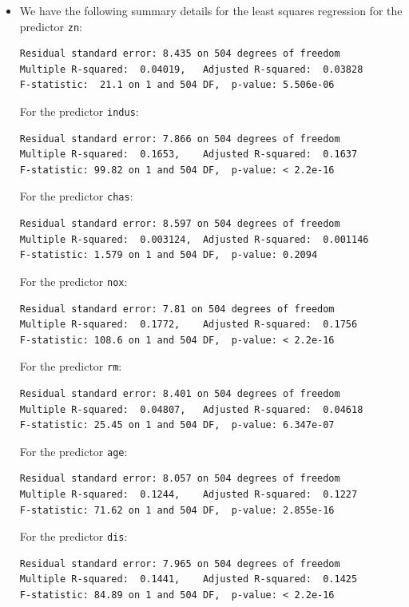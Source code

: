 \begin{itemize}
    \item[(a)] We have the following summary details for the least squares regression
        for the predictor \verb|zn|:
        \begin{lstlisting}
Residual standard error: 8.435 on 504 degrees of freedom
Multiple R-squared:  0.04019,   Adjusted R-squared:  0.03828
F-statistic:  21.1 on 1 and 504 DF,  p-value: 5.506e-06
        \end{lstlisting}

        For the predictor \verb|indus|:
        \begin{lstlisting}
Residual standard error: 7.866 on 504 degrees of freedom
Multiple R-squared:  0.1653,    Adjusted R-squared:  0.1637
F-statistic: 99.82 on 1 and 504 DF,  p-value: < 2.2e-16
        \end{lstlisting}

        For the predictor \verb|chas|:
        \begin{lstlisting}
Residual standard error: 8.597 on 504 degrees of freedom
Multiple R-squared:  0.003124,  Adjusted R-squared:  0.001146
F-statistic: 1.579 on 1 and 504 DF,  p-value: 0.2094
        \end{lstlisting}

        For the predictor \verb|nox|:
        \begin{lstlisting}
Residual standard error: 7.81 on 504 degrees of freedom
Multiple R-squared:  0.1772,    Adjusted R-squared:  0.1756
F-statistic: 108.6 on 1 and 504 DF,  p-value: < 2.2e-16
        \end{lstlisting}

        For the predictor \verb|rm|:
        \begin{lstlisting}
Residual standard error: 8.401 on 504 degrees of freedom
Multiple R-squared:  0.04807,   Adjusted R-squared:  0.04618
F-statistic: 25.45 on 1 and 504 DF,  p-value: 6.347e-07
        \end{lstlisting}

        For the predictor \verb|age|:
        \begin{lstlisting}
Residual standard error: 8.057 on 504 degrees of freedom
Multiple R-squared:  0.1244,    Adjusted R-squared:  0.1227
F-statistic: 71.62 on 1 and 504 DF,  p-value: 2.855e-16
        \end{lstlisting}

        For the predictor \verb|dis|:
        \begin{lstlisting}
Residual standard error: 7.965 on 504 degrees of freedom
Multiple R-squared:  0.1441,    Adjusted R-squared:  0.1425
F-statistic: 84.89 on 1 and 504 DF,  p-value: < 2.2e-16
        \end{lstlisting}


\end{itemize}
